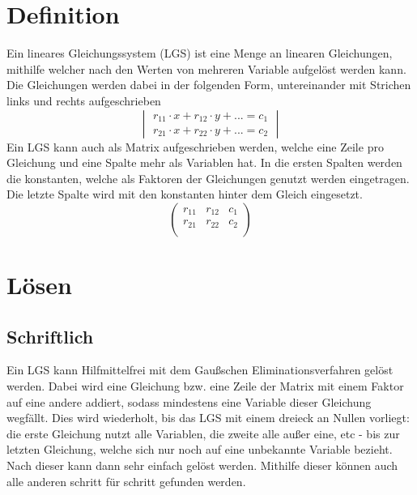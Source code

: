 \documentclass{article}
\begin{document}
  
\section{Definition}
Ein lineares Gleichungssystem (LGS) ist eine Menge an linearen Gleichungen, mithilfe welcher nach den Werten von mehreren Variable aufgelöst werden kann. Die Gleichungen werden dabei in der folgenden Form, untereinander mit Strichen links und rechts aufgeschrieben
\[
\begin{vmatrix}
 r_{11} \cdot x + r_{12} \cdot y + ... = c_1 \\
 r_{21} \cdot x + r_{22} \cdot y + ... = c_2 
\end{vmatrix}
\] 
Ein LGS kann auch als Matrix aufgeschrieben werden, welche eine Zeile pro Gleichung und eine Spalte mehr als Variablen hat. In die ersten Spalten werden die konstanten, welche als Faktoren der Gleichungen genutzt werden eingetragen. Die letzte Spalte wird mit den konstanten hinter dem Gleich eingesetzt.
\[
\begin{pmatrix}
 r_{11} & r_{12} & c_1 \\
 r_{21} & r_{22} & c_2 \\
\end{pmatrix}
\] 
 
\section{Lösen}
\subsection{Schriftlich}
Ein LGS kann Hilfmittelfrei mit dem Gaußschen Eliminationsverfahren gelöst werden. Dabei wird eine Gleichung bzw. eine Zeile der Matrix mit einem Faktor auf eine andere addiert, sodass mindestens eine Variable dieser Gleichung wegfällt. Dies wird wiederholt, bis das LGS mit einem dreieck an Nullen vorliegt: die erste Gleichung nutzt alle Variablen, die zweite alle außer eine, etc - bis zur letzten Gleichung, welche sich nur noch auf eine unbekannte Variable bezieht. Nach dieser kann dann sehr einfach gelöst werden. Mithilfe dieser können auch alle anderen schritt für schritt gefunden werden. 
 
\end{document}
